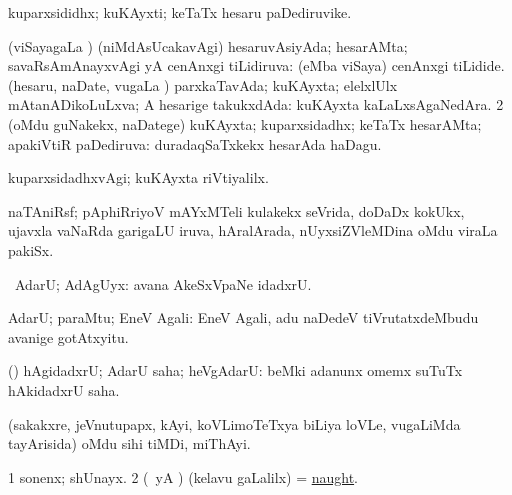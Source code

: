 \bentry
{}
\gl{\nA}
\bmng
kuparxsididhx; kuKAyxti; keTaTx hesaru paDediruvike. 
\emng
\eentry

\bentry
{}
\gl{\gu}
\bmng
\bnum
{} 
\banum
{}(viSayagaLa \vi) (niMdAsUcakavAgi) hesaruvAsiyAda; hesarAMta; savaRsAmAnayxvAgi yA cenAnxgi tiLidiruva: (eMba viSaya) cenAnxgi tiLidide. 
(hesaru, naDate, \mo vugaLa \vi) parxkaTavAda; kuKAyxta; elelxlUlx mAtanADikoLuLxva; A hesarige takukxdAda:  kuKAyxta kaLaLxsAgaNedAra. 
\eanum
\numie
\num{2} (oMdu guNakekx, naDatege) kuKAyxta; kuparxsidadhx; keTaTx hesarAMta; apakiVtiR paDediruva:  duradaqSaTxkekx hesarAda haDagu. 
\enum
\emng
\eentry

\bentry
{}
\gl{\kirxvi}
\bmng
kuparxsidadhxvAgi; kuKAyxta riVtiyalilx. 
\emng
\eentry

\bentry
{}
\gl{\nA}
\bmng
naTAniRsf; pAphiRriyoV mAYxMTeli kulakekx seVrida, doDaDx kokUkx, ujavxla vaNaRda garigaLU iruva, hAralArada, nUyxsiZVleMDina oMdu viraLa pakiSx. 
\emng
\eentry

\bentry
{}
\gl{\saMkiSx}
\bmng
{} 
\emng
\eentry

\bentry
{}
\bmng
\upa\ AdarU; AdAgUyx:  avana AkeSxVpaNe idadxrU. 
\emng
\eentry

\bentry
{}
\gl{\kirxvi}
\bmng
AdarU; paraMtu; EneV Agali:  EneV Agali, adu naDedeV tiVrutatxdeMbudu avanige gotAtxyitu. 
\emng
\eentry

\bentry
{}
\gl{\saMavayx}
\bmng
(\pArxparx) hAgidadxrU; AdarU saha; heVgAdarU:  beMki adanunx omemx suTuTx hAkidadxrU saha. 
\emng
\eentry

\bentry
{}
\gl{\nA}
\bmng
(sakakxre, jeVnutupapx, kAyi, koVLimoTeTxya biLiya loVLe, \mo vugaLiMda tayArisida) oMdu sihi tiMDi, miThAyi. 
\emng
\eentry

\bentry
{}
\gl{\nA}
\bmng
\bnum
\num{1} sonenx; shUnayx. 
\num{2} (\kAparx\ yA \pArxparx) (kelavu \pagu gaLalilx) = \hyperlink{naught(1)}{naught}. 
\enum
\emng
\eentry

